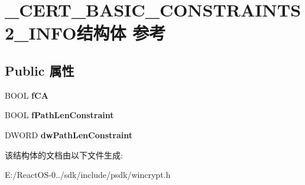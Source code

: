 \hypertarget{struct___c_e_r_t___b_a_s_i_c___c_o_n_s_t_r_a_i_n_t_s2___i_n_f_o}{}\section{\+\_\+\+C\+E\+R\+T\+\_\+\+B\+A\+S\+I\+C\+\_\+\+C\+O\+N\+S\+T\+R\+A\+I\+N\+T\+S2\+\_\+\+I\+N\+F\+O结构体 参考}
\label{struct___c_e_r_t___b_a_s_i_c___c_o_n_s_t_r_a_i_n_t_s2___i_n_f_o}
\subsection*{Public 属性}
\begin{DoxyCompactItemize}
\item 
\mbox{\label{struct___c_e_r_t___b_a_s_i_c___c_o_n_s_t_r_a_i_n_t_s2___i_n_f_o_a4d179449f8f31eac0f2e1199e66c49c5}} 
B\+O\+OL {\bfseries f\+CA}
\item 
\mbox{\label{struct___c_e_r_t___b_a_s_i_c___c_o_n_s_t_r_a_i_n_t_s2___i_n_f_o_a29d25a023e5c3b345a89be4a8d0b1bef}} 
B\+O\+OL {\bfseries f\+Path\+Len\+Constraint}
\item 
\mbox{\label{struct___c_e_r_t___b_a_s_i_c___c_o_n_s_t_r_a_i_n_t_s2___i_n_f_o_ad2980b8d5cb33cda88cc6ebf53b2032f}} 
D\+W\+O\+RD {\bfseries dw\+Path\+Len\+Constraint}
\end{DoxyCompactItemize}


该结构体的文档由以下文件生成\+:\begin{DoxyCompactItemize}
\item 
E\+:/\+React\+O\+S-\/0../sdk/include/psdk/wincrypt.\+h\end{DoxyCompactItemize}
